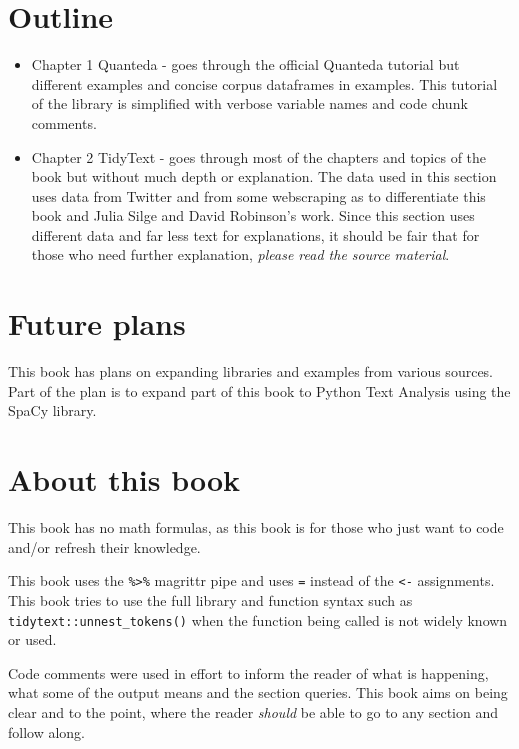 \documentclass[
  letterpaper,
  DIV=11,
  numbers=noendperiod]{scrreprt}
\begin{document}
\hypertarget{outline}{%
\section*{Outline}\label{outline}}

\begin{itemize}
\item
  Chapter 1 Quanteda - goes through the official Quanteda tutorial but
  different examples and concise corpus dataframes in examples. This
  tutorial of the library is simplified with verbose variable names and
  code chunk comments.
\item
  Chapter 2 TidyText - goes through most of the chapters and topics of
  the book but without much depth or explanation. The data used in this
  section uses data from Twitter and from some webscraping as to
  differentiate this book and Julia Silge and David Robinson's work.
  Since this section uses different data and far less text for
  explanations, it should be fair that for those who need further
  explanation, \emph{please read the source material}.
\end{itemize}

\hypertarget{future-plans}{%
\section*{Future plans}\label{future-plans}}

This book has plans on expanding libraries and examples from various
sources. Part of the plan is to expand part of this book to Python Text
Analysis using the SpaCy library.

\hypertarget{about-this-book}{%
\section*{About this book}\label{about-this-book}}

This book has no math formulas, as this book is for those who just want
to code and/or refresh their knowledge.

This book uses the \texttt{\%\textgreater{}\%} magrittr pipe and uses
\texttt{=} instead of the \texttt{\textless{}-} assignments. This book
tries to use the full library and function syntax such as
\texttt{tidytext::unnest\_tokens()} when the function being called is
not widely known or used.

Code comments were used in effort to inform the reader of what is
happening, what some of the output means and the section queries. This
book aims on being clear and to the point, where the reader
\emph{should} be able to go to any section and follow along.
\end{document}
